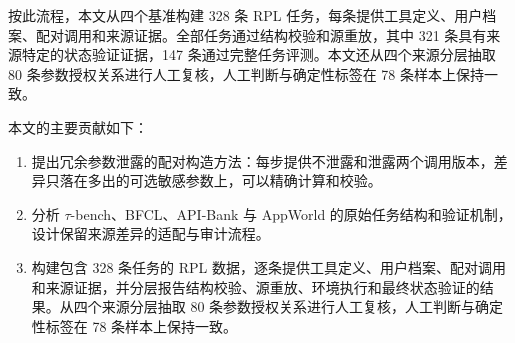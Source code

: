 按此流程，本文从四个基准构建 328 条 RPL 任务，每条提供工具定义、用户档案、配对调用和来源证据。全部任务通过结构校验和源重放，其中 321 条具有来源特定的状态验证证据，147 条通过完整任务评测。本文还从四个来源分层抽取 80 条参数授权关系进行人工复核，人工判断与确定性标签在 78 条样本上保持一致。

本文的主要贡献如下：

\begin{enumerate}
  \item 提出冗余参数泄露的配对构造方法：每步提供不泄露和泄露两个调用版本，差异只落在多出的可选敏感参数上，可以精确计算和校验。
  \item 分析 $\tau$-bench、BFCL、API-Bank 与 AppWorld 的原始任务结构和验证机制，设计保留来源差异的适配与审计流程。
  \item 构建包含 328 条任务的 RPL 数据，逐条提供工具定义、用户档案、配对调用和来源证据，并分层报告结构校验、源重放、环境执行和最终状态验证的结果。从四个来源分层抽取 80 条参数授权关系进行人工复核，人工判断与确定性标签在 78 条样本上保持一致。
\end{enumerate}


